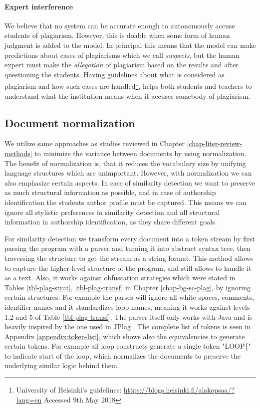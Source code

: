 \paragraph{Expert interference}
We believe that no system can be accurate enough to autonomously accuse students of plagiarism. However, this is doable when some form of human judgment is added to the model. In principal this means that the model can make predictions about cases of plagiarisms which we call \emph{suspects}, but the human expert must make the \emph{allegation} of plagiarism based on the results and after questioning the students. Having guidelines about what is considered as plagiarism and how such cases are handled\footnote{University of Helsinki's guidelines: \url{https://blogs.helsinki.fi/alakopsaa/?lang=en} Accessed 9th May 2018}, helps both students and teachers to understand what the institution means when it accuses somebody of plagiarism. 




\subsection{Document normalization}

We utilize same approaches as studies reviewed in Chapter \ref{chap-liter-review-methods} to minimize the variance between documents by using normalization. The benefit of normalization  is, that it reduces the vocabulary size by unifying language structures which are unimportant. However, with normalization we can also emphasize certain aspects. In case of similarity detection we want to preserve as much structural information as possible, and in case of authorship identification the students author profile must be captured. This means we can ignore all stylistic preferences in similarity detection and all structural information in authorship identification, as they share different goals.

For similarity detection we transform every document into a token stream by first parsing the program with a parser and turning it into abstract syntax tree, then traversing the structure to get the stream as a string format. This method allows to capture the higher-level structure of the program, and still allows to handle it as a text. Also, it works against obfuscation strategies which were stated in Tables \ref{tbl-plag-strat}, \ref{tbl-plag-transf} in Chapter \ref{chap-bg-sc-plag}, by ignoring certain structures. For example the parses will ignore all white spaces, comments, identifier names and it standardizes loop names, meaning it works against levels 1,2 and 5 of Table \ref{tbl-plag-transf}. The parser itself only works with Java and is heavily inspired by the one used in JPlag \cite{prechelt2002finding}. The complete list of tokens is seen in Appendix \ref{appendix:token-list}, which shows also the equivalencies to generate certain tokens. For example all loop constructs generate a single token "LOOP\{" to indicate start of the loop, which normalizes the documents to preserve the underlying similar logic behind them. 


